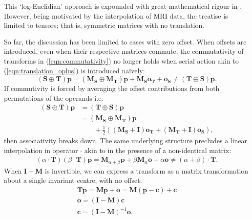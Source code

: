         This `log-Euclidian' approach is expounded with great mathematical rigour in \cite{Arsigny2005}. However, being motivated by the interpolation of MRI data, the treatise is limited to tensors; that is, symmetric matrices with no translation.
        
		    So far, the discussion has been limited to cases with zero offset. When offsets are introduced, even when their respective matrices commute, the commutativity of transforms in (\ref{eqn:commutativity}) no longer holds when serial action akin to (\ref{eqn:translation_oplus}) is introduced na\"ively:
        \begin{equation}
          (\mathbf{S} \oplus \mathbf{T})\mathbf{p} = (\mathbf{M_S} \oplus \mathbf{M_T})\mathbf{p} + \mathbf{M_So_T} + \mathbf{o_S} \ne (\mathbf{T} \oplus \mathbf{S})\mathbf{p}.
        \end{equation}
        If commutivity is forced by averaging the offset contributions from both permutations of the operands i.e.
        \begin{equation}
            \begin{split}
                (\mathbf{S} \oplus \mathbf{T})\mathbf{p} &= (\mathbf{T} \oplus \mathbf{S})\mathbf{p} \\
                                                         &= (\mathbf{M_S} \oplus \mathbf{M_T})\mathbf{p} \\
                                                         &\qquad + \frac{1}{2}\left(\left( \mathbf{M_S} + \mathbf{I} \right) \mathbf{o_T} + \left( \mathbf{M_T} + \mathbf{I} \right)\mathbf{o_S}\right),
            \end{split}
        \end{equation}
        then associativity breaks down. The same underlying structure precludes a linear interpolation in operator $\cdot$ akin to  in the presence of a non-identical matrix:
        \begin{gather}
            (\alpha \cdot \mathbf{T})(\beta \cdot \mathbf{T})\mathbf{p} = \mathbf{M}_{\alpha+\beta}\mathbf{p} + \beta\mathbf{M}_{\alpha}\mathbf{o} + \alpha\mathbf{o} \ne (\alpha + \beta) \cdot \mathbf{T}.
        \end{gather}
        When $\mathbf{I} - \mathbf{M}$ is invertible, we can express a transform as a matrix transformation about a single invariant centre, with no offset:
        \begin{gather}
          \mathbf{Tp} = \mathbf{Mp} + \mathbf{o} = \mathbf{M}(\mathbf{p}-\mathbf{c}) + \mathbf{c} \\
          \mathbf{o} = (\mathbf{I} - \mathbf{M})\mathbf{c} \\
          \mathbf{c} = (\mathbf{I} - \mathbf{M})^{-1}\mathbf{o}.
        \end{gather}
